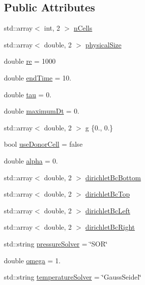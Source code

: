 \subsection*{Public Attributes}
\begin{DoxyCompactItemize}
\item 
std\+::array$<$ int, 2 $>$ \mbox{\hyperlink{structSettings_a43a0d2ee903496bfb86693a43a891a69}{n\+Cells}}
\item 
std\+::array$<$ double, 2 $>$ \mbox{\hyperlink{structSettings_a372a1549c306b12ca7bb0ed84f8a4cef}{physical\+Size}}
\item 
double \mbox{\hyperlink{structSettings_a8b8330dfa04fe849291d68eacbc8dfec}{re}} = 1000
\item 
double \mbox{\hyperlink{structSettings_a73cd9110793ede99e9ebe409e5e115fd}{end\+Time}} = 10.
\item 
double \mbox{\hyperlink{structSettings_adaa611dc8c075474d40d7149afd310d1}{tau}} = 0.
\item 
double \mbox{\hyperlink{structSettings_a988b93fdeb6c91932043b3f746b45e86}{maximum\+Dt}} = 0.
\item 
std\+::array$<$ double, 2 $>$ \mbox{\hyperlink{structSettings_a1a21237c7f5b7585e5a3545c7d4a4e8c}{g}} \{0., 0.\}
\item 
bool \mbox{\hyperlink{structSettings_a05bd5ffa1e1b48f5dc99878538596db3}{use\+Donor\+Cell}} = false
\item 
double \mbox{\hyperlink{structSettings_a8b3721d24a5417caa0f2ad6f5eb85782}{alpha}} = 0.
\item 
std\+::array$<$ double, 2 $>$ \mbox{\hyperlink{structSettings_a6b7ef8e2096739bc12cf24af9dc83db6}{dirichlet\+Bc\+Bottom}}
\item 
std\+::array$<$ double, 2 $>$ \mbox{\hyperlink{structSettings_a24362bcb0b72f282e91aca24a7fb97f0}{dirichlet\+Bc\+Top}}
\item 
std\+::array$<$ double, 2 $>$ \mbox{\hyperlink{structSettings_a72ac711659de7272956dff15acb61da9}{dirichlet\+Bc\+Left}}
\item 
std\+::array$<$ double, 2 $>$ \mbox{\hyperlink{structSettings_a1127f472f74a7220da8da5847f79c802}{dirichlet\+Bc\+Right}}
\item 
std\+::string \mbox{\hyperlink{structSettings_a888e2fca33db512d4e200b49f1f618f7}{pressure\+Solver}} = \char`\"{}S\+OR\char`\"{}
\item 
double \mbox{\hyperlink{structSettings_af5ac13128e8c442ba45eedfab06ba14c}{omega}} = 1.
\item 
std\+::string \mbox{\hyperlink{structSettings_a4df82fc7d538d1246e4c804bbd5d60fe}{temperature\+Solver}} = \char`\"{}Gauss\+Seidel\char`\"{}

\end{DoxyCompactItemize}
